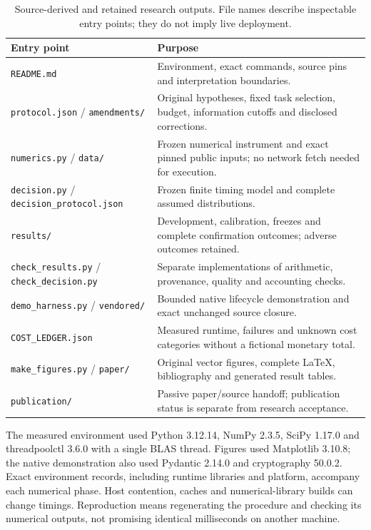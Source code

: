 \documentclass[11pt,a4paper]{article}
\newcommand{\source}{\textsf{Source-derived}}
\begin{document}
\begin{table}[ht]\centering\small
\begin{tabularx}{\linewidth}{@{}L{45mm}Y@{}}\toprule
Entry point & Purpose \\\midrule
\texttt{README.md} & Environment, exact commands, source pins and interpretation boundaries. \\
\texttt{protocol.json} / \texttt{amendments/} & Original hypotheses, fixed task selection, budget, information cutoffs and disclosed corrections. \\
\texttt{numerics.py} / \texttt{data/} & Frozen numerical instrument and exact pinned public inputs; no network fetch needed for execution. \\
\texttt{decision.py} / \texttt{decision\_protocol.json} & Frozen finite timing model and complete assumed distributions. \\
\texttt{results/} & Development, calibration, freezes and complete confirmation outcomes; adverse outcomes retained. \\
\texttt{check\_results.py} / \texttt{check\_decision.py} & Separate implementations of arithmetic, provenance, quality and accounting checks. \\
\texttt{demo\_harness.py} / \texttt{vendored/} & Bounded native lifecycle demonstration and exact unchanged source closure. \\
\texttt{COST\_LEDGER.json} & Measured runtime, failures and unknown cost categories without a fictional monetary total. \\
\texttt{make\_figures.py} / \texttt{paper/} & Original vector figures, complete LaTeX, bibliography and generated result tables. \\
\texttt{publication/} & Passive paper/source handoff; publication status is separate from research acceptance. \\\bottomrule
\end{tabularx}
\caption{\source{} and retained research outputs. File names describe inspectable entry points; they do not imply live deployment.}
\end{table}

The measured environment used Python 3.12.14, NumPy 2.3.5, SciPy 1.17.0 and threadpoolctl 3.6.0 with a single BLAS thread. Figures used Matplotlib 3.10.8; the native demonstration also used Pydantic 2.14.0 and cryptography 50.0.2. Exact environment records, including runtime libraries and platform, accompany each numerical phase. Host contention, caches and numerical-library builds can change timings. Reproduction means regenerating the procedure and checking its numerical outputs, not promising identical milliseconds on another machine.
\end{document}
